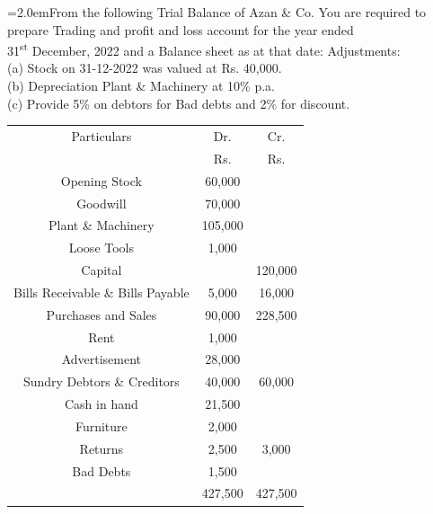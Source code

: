 \documentclass[11pt,a4paper]{article}
\newcommand{\lqn}[2]{\Needspace{6\baselineskip}\par\medskip\noindent\hangindent=2.0em\hangafter=1\makebox[2.0em][l]{\textbf{#1.}}#2\par}
\begin{document}
\lqn{105}{From the following Trial Balance of Azan \& Co. You are required to prepare Trading and profit and loss account for the year ended\\
31\textsuperscript{st} December, 2022 and a Balance sheet as at that date: Adjustments:\\
(a) Stock on 31-12-2022 was valued at Rs. 40,000.\\
(b) Depreciation Plant \& Machinery at 10\% p.a.\\
(c) Provide 5\% on debtors for Bad debts and 2\% for discount.\par
\par\smallskip\noindent\hspace*{1.2em}\begin{tabular}{|ccc|}
\hline
Particulars & Dr. & Cr. \\
 & Rs. & Rs. \\
Opening Stock & 60,000 &  \\
Goodwill & 70,000 &  \\
Plant \& Machinery & 105,000 &  \\
Loose Tools & 1,000 &  \\
Capital &  & 120,000 \\
Bills Receivable \& Bills Payable & 5,000 & 16,000 \\
Purchases and Sales & 90,000 & 228,500 \\
Rent & 1,000 &  \\
Advertisement & 28,000 &  \\
Sundry Debtors \& Creditors & 40,000 & 60,000 \\
Cash in hand & 21,500 &  \\
Furniture & 2,000 &  \\
Returns & 2,500 & 3,000 \\
Bad Debts & 1,500 &  \\
 & 427,500 & 427,500 \\
\hline
\end{tabular}\par\smallskip
}
\end{document}
